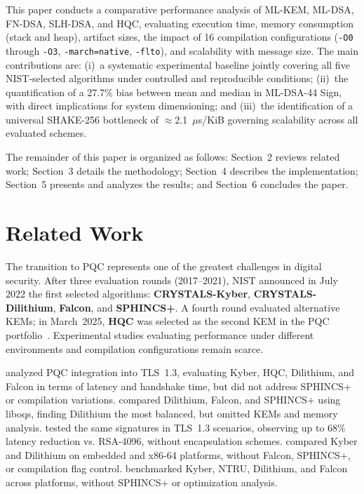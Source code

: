 \documentclass[12pt]{article}
\begin{document}
This paper conducts a comparative performance analysis of ML-KEM, ML-DSA,
FN-DSA, SLH-DSA, and HQC, evaluating execution time, memory consumption
(stack and heap), artifact sizes, the impact of 16 compilation
configurations (\texttt{-O0} through \texttt{-O3}, \texttt{-march=native},
\texttt{-flto}), and scalability with message size. The main contributions
are: (i)~a systematic experimental baseline jointly covering all five
NIST-selected algorithms under controlled and reproducible conditions;
(ii)~the quantification of a 27.7\% bias between mean and median in
ML-DSA-44 Sign, with direct implications for system dimensioning; and
(iii)~the identification of a universal SHAKE-256 bottleneck of
$\approx$2.1~$\mu$s/KiB governing scalability across all evaluated schemes.

The remainder of this paper is organized as follows: Section~2 reviews
related work; Section~3 details the methodology; Section~4 describes the
implementation; Section~5 presents and analyzes the results; and Section~6
concludes the paper.

\section{Related Work}
\label{sec:Trabalhos}
The transition to PQC represents one of the greatest challenges in digital
security. After three evaluation rounds (2017--2021), NIST announced in July
2022 the first selected algorithms: \textbf{CRYSTALS-Kyber}, \textbf{CRYSTALS-Dilithium},
\textbf{Falcon}, and \textbf{SPHINCS+}. A fourth round evaluated alternative KEMs;
in March~2025, \textbf{HQC} was selected as the second KEM in the PQC
portfolio~\cite{NISTIR8545:2025}. Experimental studies evaluating performance
under different environments and compilation configurations remain scarce.

\cite{Sosnowski:2023} analyzed PQC integration into TLS~1.3, evaluating
Kyber, HQC, Dilithium, and Falcon in terms of latency and handshake time,
but did not address SPHINCS+ or compilation variations. \cite{Opilka:2024}
compared Dilithium, Falcon, and SPHINCS+ using liboqs, finding Dilithium
the most balanced, but omitted KEMs and memory analysis. \cite{Raavi:2025}
tested the same signatures in TLS~1.3 scenarios, observing up to 68\%
latency reduction vs. RSA-4096, without encapsulation schemes.
\cite{Demir:2025} compared Kyber and Dilithium on embedded and x86-64
platforms, without Falcon, SPHINCS+, or compilation flag control.
\cite{abbasi:2025} benchmarked Kyber, NTRU, Dilithium, and Falcon across
platforms, without SPHINCS+ or optimization analysis.
\end{document}

